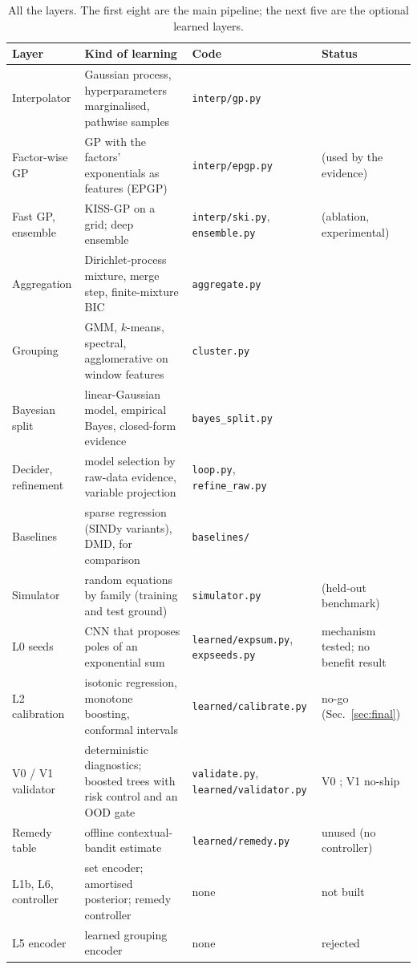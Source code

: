 \begin{table}[!htb]
\centering\small
\begin{tabular}{@{}L{2.9cm}L{4.6cm}L{3.3cm}L{2.4cm}@{}}
\toprule
Layer & Kind of learning & Code & Status\\\midrule
Interpolator & Gaussian process, hyperparameters marginalised, pathwise samples & \texttt{interp/gp.py} & \impl{}\\
Factor-wise GP & GP with the factors' exponentials as features (EPGP) & \texttt{interp/epgp.py} & \impl{} (used by the evidence)\\
Fast GP, ensemble & KISS-GP on a grid; deep ensemble & \texttt{interp/ski.py}, \texttt{ensemble.py} & \impl{} (ablation, experimental)\\
Aggregation & Dirichlet-process mixture, merge step, finite-mixture BIC & \texttt{aggregate.py} & \impl{}\\
Grouping & GMM, $k$-means, spectral, agglomerative on window features & \texttt{cluster.py} & \impl{}\\
Bayesian split & linear-Gaussian model, empirical Bayes, closed-form evidence & \texttt{bayes\_split.py} & \impl{}\\
Decider, refinement & model selection by raw-data evidence, variable projection & \texttt{loop.py}, \texttt{refine\_raw.py} & \impl{}\\
Baselines & sparse regression (SINDy variants), DMD, for comparison & \texttt{baselines/} & \impl{}\\
Simulator & random equations by family (training and test ground) & \texttt{simulator.py} & \impl{} (held-out benchmark)\\
L0 seeds & CNN that proposes poles of an exponential sum & \texttt{learned/}\allowbreak\texttt{expsum.py}, \texttt{expseeds.py} & mechanism tested; no benefit result\\
L2 calibration & isotonic regression, monotone boosting, conformal intervals & \texttt{learned/}\allowbreak\texttt{calibrate.py} & no-go (Sec.~\ref{sec:final})\\
V0 / V1 validator & deterministic diagnostics; boosted trees with risk control and an OOD gate & \texttt{validate.py}, \texttt{learned/}\allowbreak\texttt{validator.py} & V0 \impl{}; V1 no-ship\\
Remedy table & offline contextual-bandit estimate & \texttt{learned/}\allowbreak\texttt{remedy.py} & unused (no controller)\\
L1b, L6, controller & set encoder; amortised posterior; remedy controller & none & not built\\
L5 encoder & learned grouping encoder & none & rejected\\
\bottomrule
\end{tabular}
\caption{All the layers. The first eight are the main pipeline; the next five are the optional learned layers.}
\end{table}

